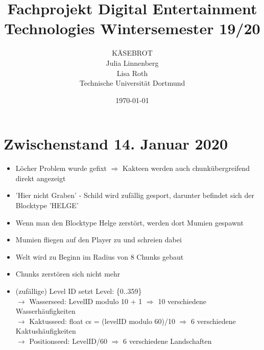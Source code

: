 \documentclass{article}
\title{Fachprojekt Digital Entertainment Technologies Wintersemester 19/20}
\author{KÄSEBROT\\
Julia Linnenberg  \\
		Lisa Roth\\	
	Technische Universität Dortmund \\
	}
\date{\today}
\begin{document}
\maketitle
\section{Zwischenstand 14. Januar 2020}
\begin{itemize}

\item Löcher Problem wurde gefixt $\Rightarrow$ Kakteen werden auch chunkübergreifend direkt angezeigt\\

\item 'Hier nicht Graben' - Schild wird zufällig gesport, darunter befindet sich der Blocktype 'HELGE'
\item Wenn man den Blocktype Helge zerstört, werden dort Mumien gespawnt
\item Mumien fliegen auf den Player zu und schreien dabei\\

\item Welt wird zu Beginn im Radius von 8 Chunks gebaut
\item Chunks zerstören sich nicht mehr\\

\item (zufällige) Level ID setzt Level: \{0..359\}\\
$\rightarrow$ Wasserseed: LevelID modulo 10 + 1 $\Rightarrow$ 10 verschiedene Wasserhäufigkeiten\\
$\rightarrow$ Kaktusseed: float cs = (levelID modulo 60)/10 $\Rightarrow$ 6 verschiedene Kaktushäufigkeiten\\
$\rightarrow$ Positionseed: LevelID/60  $\Rightarrow$ 6 verschiedene Landschaften\\

\end{itemize}
\end{document}
